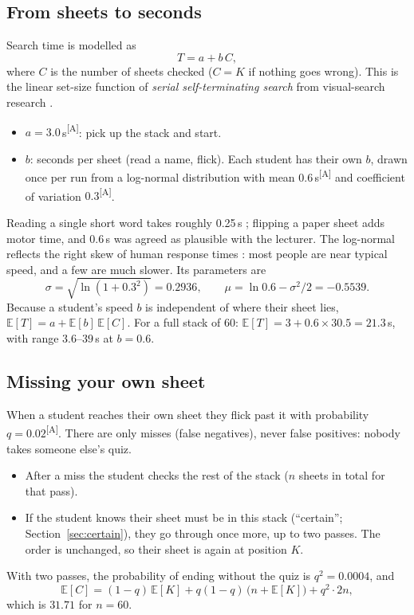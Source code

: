 \documentclass[11pt,a4paper]{article}
\newcommand{\assume}{\textcolor{flag}{\textsuperscript{[A]}}}
\newcommand{\E}{\mathbb{E}}
\begin{document}
\subsection{From sheets to seconds}
Search time is modelled as
\[
T = a + b\,C,
\]
where $C$ is the number of sheets checked ($C=K$ if nothing goes wrong). This is the linear set-size function of \emph{serial self-terminating search} from visual-search research \cite{treisman1980,wolfe1998}.
\begin{itemize}
  \item $a = 3.0$\,s\assume: pick up the stack and start.
  \item $b$: seconds per sheet (read a name, flick). Each student has their own $b$, drawn once per run from a log-normal distribution with mean $0.6$\,s\assume{} and coefficient of variation $0.3$\assume.
\end{itemize}
Reading a single short word takes roughly 0.25\,s \cite{brysbaert2019}; flipping a paper sheet adds motor time, and 0.6\,s was agreed as plausible with the lecturer. The log-normal reflects the right skew of human response times \cite{luce1986}: most people are near typical speed, and a few are much slower. Its parameters are
\[
\sigma = \sqrt{\ln(1+0.3^2)} = 0.2936,\qquad \mu = \ln 0.6 - \sigma^2/2 = -0.5539 .
\]
Because a student's speed $b$ is independent of where their sheet lies, $\E[T] = a + \E[b]\,\E[C]$. For a full stack of 60: $\E[T] = 3 + 0.6\times30.5 = 21.3$\,s, with range $3.6$--$39$\,s at $b=0.6$.

\subsection{Missing your own sheet}
When a student reaches their own sheet they flick past it with probability $q = 0.02$\assume. There are only misses (false negatives), never false positives: nobody takes someone else's quiz.
\begin{itemize}
  \item After a miss the student checks the rest of the stack ($n$ sheets in total for that pass).
  \item If the student knows their sheet must be in this stack (``certain''; Section~\ref{sec:certain}), they go through once more, up to two passes. The order is unchanged, so their sheet is again at position $K$.
\end{itemize}
With two passes, the probability of ending without the quiz is $q^2 = 0.0004$, and
\[
\E[C] = (1-q)\,\E[K] + q(1-q)\,\bigl(n+\E[K]\bigr) + q^2\cdot 2n,
\]
which is $31.71$ for $n=60$.
\end{document}
